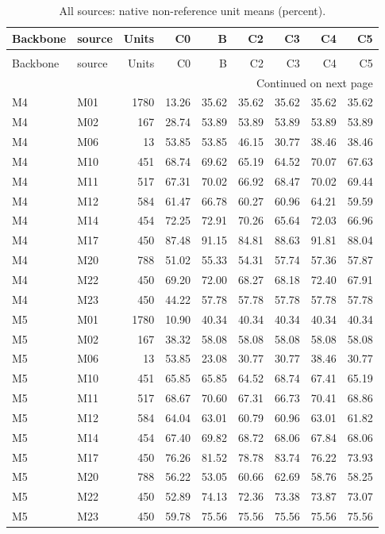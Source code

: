 \begin{longtable}{llrrrrrrr}
\caption{All sources: native non-reference unit means (percent).} \label{tab:sources} \\
\toprule
Backbone & source & Units & C0 & B & C2 & C3 & C4 & C5 \\
\midrule
\endfirsthead
\caption[]{All sources: native non-reference unit means (percent).} \\
\toprule
Backbone & source & Units & C0 & B & C2 & C3 & C4 & C5 \\
\midrule
\endhead
\midrule
\multicolumn{9}{r}{Continued on next page} \\
\midrule
\endfoot
\bottomrule
\endlastfoot
M4 & M01 & 1780 & 13.26 & 35.62 & 35.62 & 35.62 & 35.62 & 35.62 \\
M4 & M02 & 167 & 28.74 & 53.89 & 53.89 & 53.89 & 53.89 & 53.89 \\
M4 & M06 & 13 & 53.85 & 53.85 & 46.15 & 30.77 & 38.46 & 38.46 \\
M4 & M10 & 451 & 68.74 & 69.62 & 65.19 & 64.52 & 70.07 & 67.63 \\
M4 & M11 & 517 & 67.31 & 70.02 & 66.92 & 68.47 & 70.02 & 69.44 \\
M4 & M12 & 584 & 61.47 & 66.78 & 60.27 & 60.96 & 64.21 & 59.59 \\
M4 & M14 & 454 & 72.25 & 72.91 & 70.26 & 65.64 & 72.03 & 66.96 \\
M4 & M17 & 450 & 87.48 & 91.15 & 84.81 & 88.63 & 91.81 & 88.04 \\
M4 & M20 & 788 & 51.02 & 55.33 & 54.31 & 57.74 & 57.36 & 57.87 \\
M4 & M22 & 450 & 69.20 & 72.00 & 68.27 & 68.18 & 72.40 & 67.91 \\
M4 & M23 & 450 & 44.22 & 57.78 & 57.78 & 57.78 & 57.78 & 57.78 \\
M5 & M01 & 1780 & 10.90 & 40.34 & 40.34 & 40.34 & 40.34 & 40.34 \\
M5 & M02 & 167 & 38.32 & 58.08 & 58.08 & 58.08 & 58.08 & 58.08 \\
M5 & M06 & 13 & 53.85 & 23.08 & 30.77 & 30.77 & 38.46 & 30.77 \\
M5 & M10 & 451 & 65.85 & 65.85 & 64.52 & 68.74 & 67.41 & 65.19 \\
M5 & M11 & 517 & 68.67 & 70.60 & 67.31 & 66.73 & 70.41 & 68.86 \\
M5 & M12 & 584 & 64.04 & 63.01 & 60.79 & 60.96 & 63.01 & 61.82 \\
M5 & M14 & 454 & 67.40 & 69.82 & 68.72 & 68.06 & 67.84 & 68.06 \\
M5 & M17 & 450 & 76.26 & 81.52 & 78.78 & 83.74 & 76.22 & 73.93 \\
M5 & M20 & 788 & 56.22 & 53.05 & 60.66 & 62.69 & 58.76 & 58.25 \\
M5 & M22 & 450 & 52.89 & 74.13 & 72.36 & 73.38 & 73.87 & 73.07 \\
M5 & M23 & 450 & 59.78 & 75.56 & 75.56 & 75.56 & 75.56 & 75.56 \\
\end{longtable}
